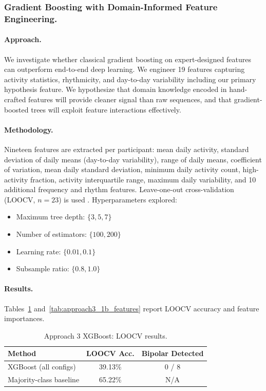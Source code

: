 \subsubsection{Gradient Boosting with Domain-Informed Feature Engineering.}

\paragraph{Approach.}
We investigate whether classical gradient boosting \cite{chen2016xgboost} on expert-designed features can outperform end-to-end deep learning. We engineer 19 features capturing activity statistics, rhythmicity, and day-to-day variability including our primary hypothesis feature. We hypothesize that domain knowledge encoded in hand-crafted features will provide cleaner signal than raw sequences, and that gradient-boosted trees will exploit feature interactions effectively.

\paragraph{Methodology.}
Nineteen features are extracted per participant: mean daily activity, standard deviation of daily means (day-to-day variability), range of daily means, coefficient of variation, mean daily standard deviation, minimum daily activity count, high-activity fraction, activity interquartile range, maximum daily variability, and 10 additional frequency and rhythm features. Leave-one-out cross-validation (LOOCV, $n = 23$) is used \cite{geisser1975loocv}. Hyperparameters explored:
\begin{itemize}[nosep]
  \item Maximum tree depth: $\{3, 5, 7\}$
  \item Number of estimators: $\{100, 200\}$
  \item Learning rate: $\{0.01, 0.1\}$
  \item Subsample ratio: $\{0.8, 1.0\}$
\end{itemize}

\paragraph{Results.}
Tables~\ref{tab:approach3_1b_results} and~\ref{tab:approach3_1b_features} report LOOCV accuracy and feature importances.

\begin{table}[H]
\centering
\caption{Approach 3 XGBoost: LOOCV results.}
\label{tab:approach3_1b_results}
\begin{tabular}{lcc}
\toprule
\textbf{Method} & \textbf{LOOCV Acc.} & \textbf{Bipolar Detected} \\
\midrule
XGBoost (all configs) & 39.13\% & 0 / 8 \\
Majority-class baseline & 65.22\% & N/A \\
\bottomrule
\end{tabular}
\end{table}

